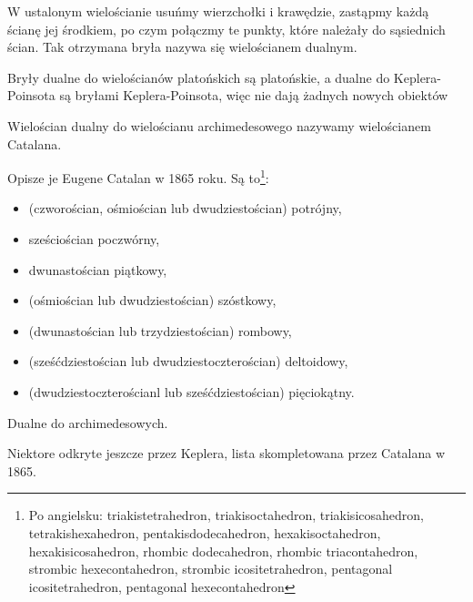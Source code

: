 %

\begin{definition}
    W ustalonym wielościanie usuńmy wierzchołki i krawędzie, zastąpmy każdą ścianę jej środkiem, po czym połączmy te punkty, które należały do sąsiednich ścian.
    Tak otrzymana bryła nazywa się wielościanem dualnym.
\end{definition}

Bryły dualne do wielościanów platońskich są platońskie, a dualne do Keplera-Poinsota są bryłami Keplera-Poinsota, więc nie dają żadnych nowych obiektów

\begin{definition}
    Wielościan dualny do wielościanu archimedesowego nazywamy wielościanem Catalana.
\end{definition}

Opisze je Eugene Catalan w 1865 roku.
Są to\footnote{\raggedright{Po angielsku: triakistetrahedron, triakisoctahedron, triakisicosahedron, tetrakishexahedron, pentakisdodecahedron, hexakisoctahedron, hexakisicosahedron, rhombic dodecahedron, rhombic triacontahedron, strombic hexecontahedron, strombic icositetrahedron, pentagonal icositetrahedron, pentagonal hexecontahedron}}:
 
\begin{itemize}
\item (czworościan, ośmiościan lub dwudziestościan) potrójny,
\item sześciościan poczwórny,
\item dwunastościan piątkowy,
\item (ośmiościan lub dwudziestościan) szóstkowy,
\item (dwunastościan lub trzydziestościan) rombowy,
\item (sześćdziestościan lub dwudziestoczterościan) deltoidowy,
\item (dwudziestoczterościanl lub sześćdziestościan) pięciokątny.
\end{itemize}

Dualne do archimedesowych.

Niektore odkryte jeszcze przez Keplera, lista skompletowana przez Catalana w 1865.

%